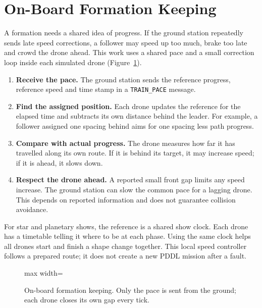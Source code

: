 \documentclass[11pt,a4paper,oneside]{report}
\newcommand{\cmd}[1]{\mbox{\texttt{#1}}}
\begin{document}
\section{On-Board Formation Keeping}
A formation needs a shared idea of progress. If the ground station repeatedly
sends late speed corrections, a follower may speed up too much, brake too late
and crowd the drone ahead. This work uses a shared pace and a small correction
loop inside each simulated drone (Figure~\ref{fig:pace}).
\begin{enumerate}
\item \textbf{Receive the pace.} The ground station sends the reference progress,
reference speed and time stamp in a \cmd{TRAIN\_PACE} message.
\item \textbf{Find the assigned position.} Each drone updates the reference for
the elapsed time and subtracts its own distance behind the leader. For example,
a follower assigned one spacing behind aims for one spacing less path progress.
\item \textbf{Compare with actual progress.} The drone measures how far it has
travelled along its own route. If it is behind its target, it may increase speed;
if it is ahead, it slows down.
\item \textbf{Respect the drone ahead.} A reported small front gap limits any
speed increase. The ground station can slow the common pace for a lagging drone.
This depends on reported information and does not guarantee collision avoidance.
\end{enumerate}
For star and planetary shows, the reference is a shared show clock. Each drone
has a timetable telling it where to be at each phase. Using the same clock helps
all drones start and finish a shape change together. This local speed controller
follows a prepared route; it does not create a new PDDL mission after a fault.

\begin{figure}[H]
\centering
\begin{adjustbox}{max width=\linewidth}
\end{adjustbox}
\caption[Local formation control]{On-board formation keeping. Only the pace is sent from the ground; each drone closes its
own gap every tick.}
\label{fig:pace}
\end{figure}
\end{document}
